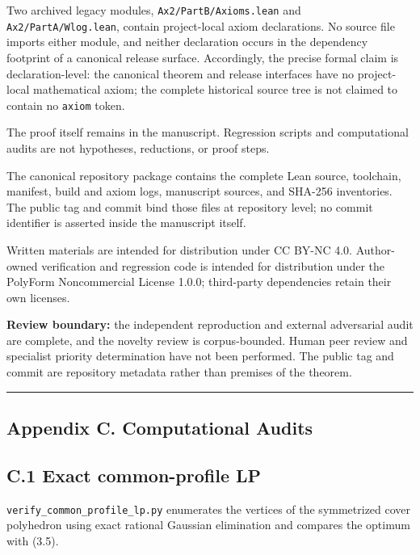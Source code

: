 \documentclass[english,11pt,a4paper]{article}
\begin{document}
Two archived legacy modules, \nolinkurl{Ax2/PartB/Axioms.lean} and
\nolinkurl{Ax2/PartA/Wlog.lean}, contain project-local axiom declarations.
No source file imports either module, and neither declaration occurs in
the dependency footprint of a canonical release surface. Accordingly,
the precise formal claim is declaration-level: the canonical theorem and
release interfaces have no project-local mathematical axiom; the
complete historical source tree is not claimed to contain no
\nolinkurl{axiom} token.

The proof itself remains in the manuscript. Regression scripts and
computational audits are not hypotheses, reductions, or proof steps.

The canonical repository package contains the complete Lean source,
toolchain, manifest, build and axiom logs, manuscript sources, and
SHA-256 inventories. The public tag and commit bind those files at
repository level; no commit identifier is asserted inside the manuscript
itself.

Written materials are intended for distribution under CC BY-NC 4.0.
Author-owned verification and regression code is intended for
distribution under the PolyForm Noncommercial License 1.0.0; third-party
dependencies retain their own licenses.

\textbf{Review boundary:} the independent reproduction and external
adversarial audit are complete, and the novelty review is
corpus-bounded. Human peer review and specialist priority determination
have not been performed. The public tag and commit are repository
metadata rather than premises of the theorem.

\begin{center}\rule{0.5\linewidth}{0.5pt}\end{center}

\subsection{Appendix C. Computational
Audits}\label{appendix-c.-computational-audits}

\subsection{C.1 Exact common-profile
LP}\label{c.1-exact-common-profile-lp}

\nolinkurl{verify_common_profile_lp.py} enumerates the vertices of the
symmetrized cover polyhedron using exact rational Gaussian elimination
and compares the optimum with (3.5).
\end{document}
